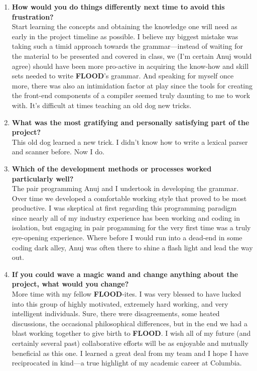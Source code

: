 \documentclass[12pt]{report}
\begin{document}
\begin{enumerate}
\item \textbf{How would you do things differently next time to avoid this frustration?}\\
Start learning the concepts and obtaining the knowledge one will need as early in the project timeline as possible. I believe my biggest mistake was taking such a timid approach towards the grammar---instead of waiting for the material to be presented and covered in class, we (I'm certain Anuj would agree) should have been more pro-active in acquiring the know-how and skill sets needed to write \textbf{FLOOD}'s grammar. And speaking for myself once more, there was also an intimidation factor at play since the tools for creating the front-end components of a compiler seemed truly daunting to me to work with. It's difficult at times teaching an old dog new tricks.
\item \textbf{What was the most gratifying and personally satisfying part of the project?}\\
This old dog learned a new trick. I didn't know how to write a lexical parser and scanner before. Now I do.
\item \textbf{Which of the development methods or processes worked particularly well?}\\
The pair programming Anuj and I undertook in developing the grammar. Over time we developed a comfortable working style that proved to be most productive. I was skeptical at first regarding this programming paradigm since nearly all of my industry experience has been working and coding in isolation, but engaging in pair progamming for the very first time was a truly eye-opening experience. Where before I would run into a dead-end in some coding dark alley, Anuj was often there to shine a flash light and lead the way out.
\item \textbf{If you could wave a magic wand and change anything about the project, what would you change?}\\
More time with my fellow \textbf{FLOOD}-ites. I was very blessed to have lucked into this group of highly motivated, extremely hard working, and very intelligent individuals. Sure, there were disagreements, some heated discussions, the occasional philosophical differences, but in the end we had a blast working together to give birth to \textbf{FLOOD}. I wish all of my future (and certainly several past) collaborative efforts will be as enjoyable and mutually beneficial as this one. I learned a great deal from my team and I hope I have reciprocated in kind---a true highlight of my academic career at Columbia.
\end{enumerate}
\end{document}
